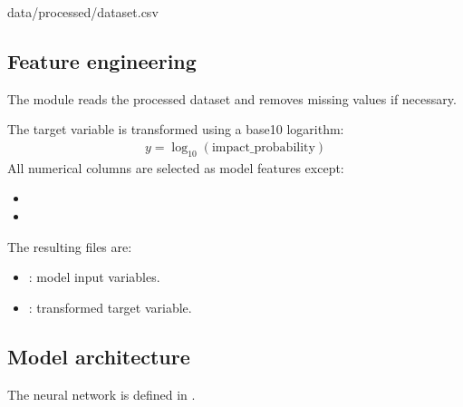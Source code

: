 \documentclass[letterpaper,10pt,english]{sphinxmanual}
\begin{document}
\begin{sphinxVerbatim}[commandchars=\\\{\}]
data/processed/dataset.csv
\end{sphinxVerbatim}


\subsection{Feature engineering}
\label{\detokenize{workflow:feature-engineering}}
\sphinxAtStartPar
The  module reads the processed dataset and removes missing
values if necessary.

\sphinxAtStartPar
The target variable is transformed using a base\sphinxhyphen{}10 logarithm:
\begin{equation*}
\begin{split}y = \log_{10}\left(\text{impact\_probability}\right)\end{split}
\end{equation*}
\sphinxAtStartPar
All numerical columns are selected as model features except:
\begin{itemize}
\item {} 
\sphinxAtStartPar
{}

\item {} 
\sphinxAtStartPar
{}

\end{itemize}

\sphinxAtStartPar
The resulting files are:
\begin{itemize}
\item {} 
\sphinxAtStartPar
{}: model input variables.

\item {} 
\sphinxAtStartPar
{}: transformed target variable.

\end{itemize}


\subsection{Model architecture}
\label{\detokenize{workflow:model-architecture}}
\sphinxAtStartPar
The neural network is defined in .
\end{document}
